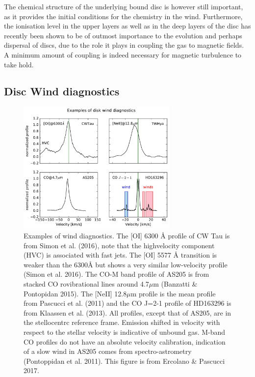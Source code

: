 \documentclass[10pt,fleqn,twoside]{article}
\newcommand{\Tcol}{\color{blue}}
\begin{document}
The chemical structure of the underlying bound disc is however still
important, as it provides the initial conditions for the chemistry in
the wind. Furthermore, the ionisation level in the upper layers as
well as in the deep layers of the disc has recently been shown to be of outmost importance to the evolution and perhaps dispersal of discs, due to the role it plays in coupling the gas to magnetic fields. A minimum amount of coupling is indeed necessary for magnetic turbulence to take hold.


\subsection{\Tcol Disc Wind diagnostics}
 \begin{figure}
   \centering
   \includegraphics[width=0.7\textwidth]{winds.pdf}

   \caption{Examples of wind diagnostics. The [OI] 6300 Å profile of CW Tau is from Simon et al. (2016), note that the highvelocity
component (HVC) is associated with fast jets. The [OI] 5577 Å transition is weaker than the 6300Å but shows a
very similar low-velocity profile (Simon et al. 2016). The CO-M band profile of AS205 is from stacked CO rovibrational
lines around 4.7$\mu$m (Banzatti \& Pontopidan 2015). The [NeII] 12.8$\mu$m profile is the mean profile from Pascucci et al.
(2011) and the CO J=2-1 profile of HD163296 is from Klaassen et al. (2013). All profiles, except that of AS205, are in
the stellocentrc reference frame. Emission shifted in velocity with respect to the stellar velocity is indicative of unbound
gas. M-band CO profiles do not have an absolute velocity calibration, indication of a slow wind in AS205 comes from
spectro-astrometry (Pontoppidan et al. 2011). This figure is from
Ercolano \& Pascucci 2017.}
              \label{fig:neii}%
    \end{figure}
\end{document}
